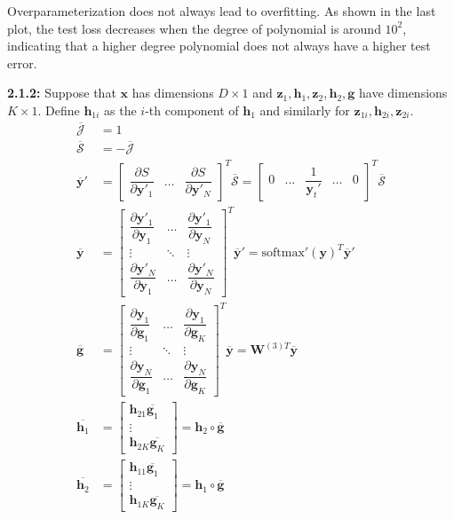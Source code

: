 \documentclass[12pt]{article}
\newcommand{\m}[1]{\mathbf{#1}}
\newcommand{\ol}[1]{\overline{#1}}
\begin{document}
Overparameterization does not always lead to overfitting. As shown in the last plot, the test loss decreases when the degree of polynomial is around $10^2$, indicating that a higher degree polynomial does not always have a higher test error.

\textbf{2.1.2:} Suppose that $\m x$ has dimensions $D \times 1$ and $\m z_1, \m h_1, \m z_2, \m h_2, \m g$ have dimensions $K \times 1$. Define $\m h_{1i}$ as the $i$-th component of $\m h_1$ and similarly for $\m z_{1i}, \m h_{2i}, \m z_{2i}$.
\begin{align*}
    \ol{\mathcal{J}} &= 1\\
    \ol{\mathcal{S}} &= -\ol{\mathcal{J}}\\
    \ol{\m y}' &= \begin{bmatrix} \dfrac{\partial S}{\partial\m y'_1} & \dots & \dfrac{\partial S}{\partial\m y'_N} \end{bmatrix}^T \ol{\mathcal{S}} = \begin{bmatrix} 0 & \dots & \dfrac{1}{\m y_t'} & \dots & 0 \end{bmatrix}^T \ol{\mathcal{S}}\\
    \ol{\m y} &= \begin{bmatrix} \dfrac{\partial\m y'_1}{\partial\m y_1} & \dots & \dfrac{\partial\m y'_1}{\partial\m y_N} \\ \vdots & \ddots & \vdots \\ \dfrac{\partial\m y'_N}{\partial\m y_1} & \dots & \dfrac{\partial\m y'_N}{\partial\m y_N} \end{bmatrix}^T \ol{\m y}' = \text{softmax}'(\m y)^T \ol{\m y}'\\
    \ol{\m g} &= \begin{bmatrix} \dfrac{\partial\m y_1}{\partial\m g_1} & \dots & \dfrac{\partial\m y_1}{\partial\m g_K} \\ \vdots & \ddots & \vdots \\ \dfrac{\partial\m y_N}{\partial\m g_1} & \dots & \dfrac{\partial\m y_N}{\partial\m g_K} \end{bmatrix}^T \ol{\m y} = \m W^{(3)T} \ol{\m y}\\
    \ol{\m h_1} &= \begin{bmatrix} \m h_{21}\ol{\m g_1} \\ \vdots \\ \m h_{2K}\ol{\m g_K} \end{bmatrix} = \m h_2 \circ \ol{\m g}\\
    \ol{\m h_2} &= \begin{bmatrix} \m h_{11}\ol{\m g_1} \\ \vdots \\ \m h_{1K}\ol{\m g_K} \end{bmatrix} = \m h_1 \circ \ol{\m g}\\

\end{align*}
\end{document}
